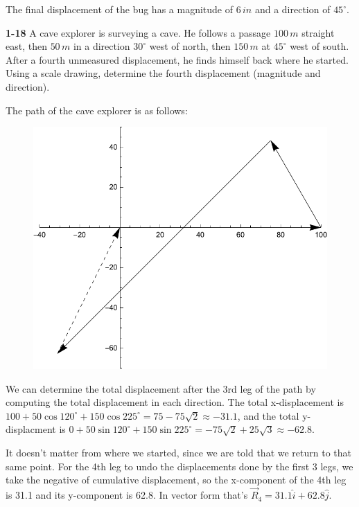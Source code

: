\documentclass{amsart}
\begin{document}
The final displacement of the bug has a magnitude of $6\,in$ and a direction of $45^\circ$.

\textbf{1-18} A cave explorer is surveying a cave.  He follows a passage $100\,m$ straight east, then $50\,m$ in a direction $30^\circ$ west of north, then $150\,m$ at $45^\circ$ west of south.
After a fourth unmeasured displacement, he finds himself back where he started.
Using a scale drawing, determine the fourth displacement (magnitude and direction).

The path of the cave explorer is as follows:

\begin{figure}[h]
\includegraphics[scale=0.32]{1-18}
\end{figure}

We can determine the total displacement after the 3rd leg of the path by computing the total displacement in each direction.
The total x-displacement is $100 + 50 \cos 120^\circ + 150 \cos 225^\circ = 75 - 75 \sqrt{2} \approx -31.1$,
and the total y-displacment is $0 + 50 \sin 120^\circ + 150 \sin 225^\circ = -75 \sqrt{2} +25 \sqrt{3} \approx -62.8$.

It doesn't matter from where we started, since we are told that we return to that same point.
For the 4th leg to undo the displacements done by the first 3 legs,
we take the negative of cumulative displacement,
so the x-component of the 4th leg is 31.1 and its y-component is 62.8.
In vector form that's $\vec R_4 = 31.1 \hat i + 62.8 \hat j$.
\end{document}

